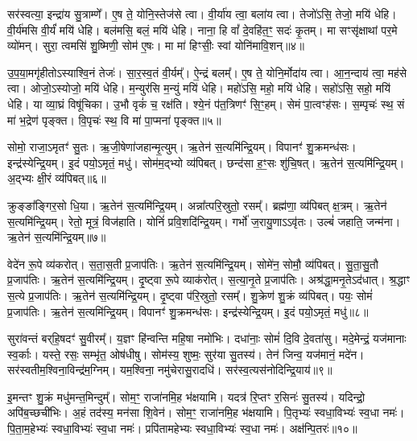 सर॑स्वत्या॒ इन्द्रा॑य सु॒त्राम्णे᳚।
ए॒ष ते॒ योनि॒स्तेज॑से त्वा।
वी॒र्या॑य त्वा॒ बला॑य त्वा।
तेजो॑ऽसि॒ तेजो॒ मयि॑ धेहि।
वी॒र्य॑मसि वी॒र्यं॑ मयि॑ धेहि।
बल॑मसि॒ बलं॒ मयि॑ धेहि।
नाना॒ हि वां᳚ दे॒वहि॑त॒ꣳ॒ सदः॑ कृ॒तम्।
मा सꣳसृ॑क्षाथां पर॒मे व्यो॑मन्।
सुरा॒ त्वमसि॑ शु॒ष्मिणी॒ सोम॑ ए॒षः।
मा मा॑ हिꣳसीः॒ स्वां योनि॑मावि॒शन्॥४॥

उ॒प॒या॒मगृ॑हीतो\-ऽस्याश्वि॒नं तेजः॑।
सा॒र॒स्व॒तं वी॒र्यम्᳚।
ऐ॒न्द्रं बलम्᳚।
ए॒ष ते॒ योनि॒र्मोदा॑य त्वा।
आ॒न॒न्दाय॑ त्वा॒ मह॑से त्वा।
ओजो॒ऽस्योजो॒ मयि॑ धेहि।
म॒न्युर॑सि म॒न्युं मयि॑ धेहि।
महो॑ऽसि॒ महो॒ मयि॑ धेहि।
सहो॑ऽसि॒ सहो॒ मयि॑ धेहि।
या व्या॒घ्रं विषू॑चिका।
उ॒भौ वृकं॑ च॒ रक्ष॑ति।
श्ये॒नं प॑त॒त्रिणꣳ॑ सि॒ꣳ॒हम्।
सेमं पा॒त्वꣳह॑सः।
स॒म्पृचः॑ स्थ॒ सं मा॑ भ॒द्रेण॑ पृङ्क्त।
वि॒पृचः॑ स्थ॒ वि मा॑ पा॒प्मना॑ पृङ्क्त॥५॥\anuvakamend[ह॒विः प्र॒त्यङ्ख्सोमो॒ अति॑द्रुतो गृह्णाम्यावि॒शन्विषू॑चिका॒ पञ्च॑ च]

सोमो॒ राजा॒\-ऽमृतꣳ॑ सु॒तः।
ऋ॒जी॒षेणा॑जहान्मृ॒त्युम्।
ऋ॒तेन॑ स॒त्यमि॑न्द्रि॒यम्।
विपानꣳ॑ शु॒क्रमन्ध॑सः।
इन्द्र॑स्येन्द्रि॒यम्।
इ॒दं पयो॒\-ऽमृतं॒ मधु॑।
सोम॑म॒द्भ्यो व्य॑पिबत्।
छन्द॑सा ह॒ꣳ॒सः शु॑चि॒षत्।
ऋ॒तेन॑ स॒त्यमि॑न्द्रि॒यम्।
अ॒द्भ्यः क्षी॒रं व्य॑पिबत्॥६॥

क्रुङ्ङा᳚ङ्गिर॒सो धि॒या।
ऋ॒तेन॑ स॒त्यमि॑न्द्रि॒यम्।
अन्ना᳚त्परि॒स्रुतो॒ रसम्᳚।
ब्रह्म॑णा॒ व्य॑पिबत् क्ष॒त्रम्।
ऋ॒तेन॑ स॒त्यमि॑न्द्रि॒यम्।
रेतो॒ मूत्रं॒ विज॑हाति।
योनिं॑ प्रवि॒शदि॑न्द्रि॒यम्।
गर्भो॑ ज॒रायु॒णा\-ऽऽवृ॑तः।
उल्बं॑ जहाति॒ जन्म॑ना।
ऋ॒तेन॑ स॒त्यमि॑न्द्रि॒यम्॥७॥

वेदे॑न रू॒पे व्य॑करोत्।
स॒ता॒स॒ती प्र॒जा\-प॑तिः।
ऋ॒तेन॑ स॒त्यमि॑न्द्रि॒यम्।
सोमे॑न॒ सोमौ॒ व्य॑पिबत्।
सु॒ता॒सु॒तौ प्र॒जा\-प॑तिः।
ऋ॒तेन॑ स॒त्यमि॑न्द्रि॒यम्।
दृ॒ष्ट्वा रू॒पे व्याक॑रोत्।
स॒त्या॒नृ॒ते प्र॒जा\-प॑तिः।
अश्र॑द्धा॒मनृ॒ते\-ऽद॑धात्।
श्र॒द्धाꣳ स॒त्ये प्र॒जा\-प॑तिः।
ऋ॒तेन॑ स॒त्यमि॑न्द्रि॒यम्।
दृ॒ष्ट्वा प॑रि॒स्रुतो॒ रसम्᳚।
शु॒क्रेण॑ शु॒क्रं व्य॑पिबत्।
पयः॒ सोमं॑ प्र॒जा\-प॑तिः।
ऋ॒तेन॑ स॒त्यमि॑न्द्रि॒यम्।
विपानꣳ॑ शु॒क्रमन्ध॑सः।
इन्द्र॑स्येन्द्रि॒यम्।
इ॒दं पयो॒\-ऽमृतं॒ मधु॑॥८॥\anuvakamend[अ॒द्भ्यः क्षी॒रं व्य॑पिब॒ज्जन्म॑न॒र्तेन॑ स॒त्यमि॑न्द्रि॒यꣴ श्र॒द्धाꣳ स॒त्ये प्र॒जा\-प॑तिर॒ष्टौ च॑]

सुरा॑वन्तं बर्‌\mbox{}हि॒षदꣳ॑ सु॒वीरम्᳚।
य॒ज्ञꣳ हि॑न्वन्ति महि॒षा नमो॑भिः।
दधा॑नाः॒ सोमं॑ दि॒वि दे॒वता॑सु।
मदे॒मेन्द्रं॒ यज॑मानाः स्व॒र्काः।
यस्ते॒ रसः॒ सम्भृ॑त॒ ओष॑धीषु।
सोम॑स्य॒ शुष्मः॒ सुर॑या सु॒तस्य॑।
तेन॑ जिन्व॒ यज॑मानं॒ मदे॑न।
सर॑स्वतीम॒श्विना॒विन्द्र॑म॒ग्निम्।
यम॒श्विना॒ नमु॑चेरासु॒रादधि॑।
सर॑स्व॒त्यस॑नोदिन्द्रि॒याय॑॥९॥

इ॒मन्तꣳ शु॒क्रं मधु॑मन्त॒मिन्दुम्᳚।
सोम॒ꣳ॒ राजा॑नमि॒ह भ॑क्षयामि।
यदत्र॑ रि॒प्तꣳ र॒सिनः॑ सु॒तस्य॑।
यदिन्द्रो॒ अपि॑ब॒च्छची॑भिः।
अ॒हं तद॑स्य॒ मन॑सा शि॒वेन॑।
सोम॒ꣳ॒ राजा॑नमि॒ह भ॑क्षयामि।
पि॒तृभ्यः॑ स्वधा॒विभ्यः॑ स्व॒धा नमः॑।
पि॒ता॒म॒हेभ्यः॑ स्वधा॒विभ्यः॑ स्व॒धा नमः॑।
प्रपि॑तामहेभ्यः स्वधा॒विभ्यः॑ स्व॒धा नमः॑।
अक्ष॑न्पि॒तरः॑॥१०॥


